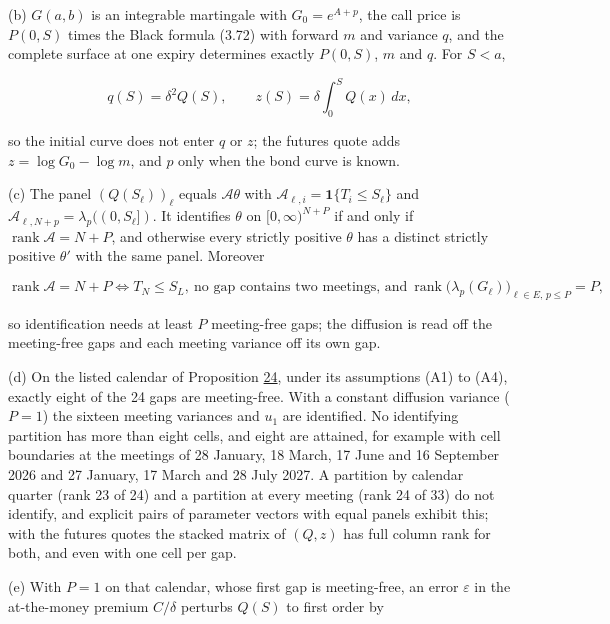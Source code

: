 \documentclass[11pt]{article}
\begin{document}
(b) \(G(a,b)\) is an integrable martingale with \(G_0=e^{A+p}\), the call price is \(P(0,S)\) times the Black formula (3.72) with forward \(m\) and variance \(q\), and the complete surface at one expiry determines exactly \(P(0,S)\), \(m\) and \(q\). For \(S<a\),

\begin{equation*}
q(S)=\delta^2Q(S),\qquad z(S)=\delta\int_0^SQ(x)\,dx, \tag{3.189}\label{eq:3.189}
\end{equation*}

so the initial curve does not enter \(q\) or \(z\); the futures quote adds \(z=\log G_0-\log m\), and \(p\) only when the bond curve is known.

(c) The panel \((Q(S_\ell))_\ell\) equals \(\mathcal A\theta\) with \(\mathcal A_{\ell,i}=\mathbf 1\{T_i\le S_\ell\}\) and \(\mathcal A_{\ell,N+p}=\lambda_p((0,S_\ell])\). It identifies \(\theta\) on \([0,\infty)^{N+P}\) if and only if \(\operatorname{rank}\mathcal A=N+P\), and otherwise every strictly positive \(\theta\) has a distinct strictly positive \(\theta'\) with the same panel. Moreover

\begin{equation*}
\operatorname{rank}\mathcal A=N+P\iff T_N\le S_L,\ \text{no gap contains two meetings, and}\ \operatorname{rank}\bigl(\lambda_p(G_\ell)\bigr)_{\ell\in E,\,p\le P}=P, \tag{3.190}\label{eq:3.190}
\end{equation*}

so identification needs at least \(P\) meeting-free gaps; the diffusion is read off the meeting-free gaps and each meeting variance off its own gap.

(d) On the listed calendar of Proposition \hyperref[res:Proposition-24]{24}, under its assumptions (A1) to (A4), exactly eight of the 24 gaps are meeting-free. With a constant diffusion variance (\(P=1\)) the sixteen meeting variances and \(u_1\) are identified. No identifying partition has more than eight cells, and eight are attained, for example with cell boundaries at the meetings of 28 January, 18 March, 17 June and 16 September 2026 and 27 January, 17 March and 28 July 2027. A partition by calendar quarter (rank 23 of 24) and a partition at every meeting (rank 24 of 33) do not identify, and explicit pairs of parameter vectors with equal panels exhibit this; with the futures quotes the stacked matrix of \((Q,z)\) has full column rank for both, and even with one cell per gap.

(e) With \(P=1\) on that calendar, whose first gap is meeting-free, an error \(\varepsilon\) in the at-the-money premium \(C/\delta\) perturbs \(Q(S)\) to first order by
\end{document}
